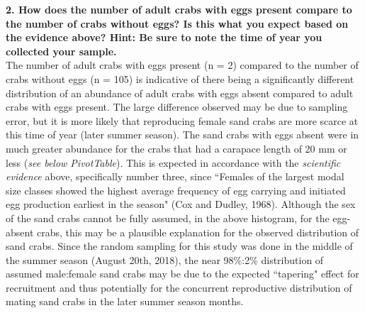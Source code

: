 \documentclass[11pt]{article}
\begin{document}
{\bf 2. How does the number of adult crabs with eggs present compare to the number of crabs without eggs? Is this what you expect based on the evidence above? Hint: Be sure to note the time of year you collected your sample.} \\
The number of adult crabs with eggs present (n = 2) compared to the number of crabs without eggs (n = 105) is indicative of there being a significantly different distribution of an abundance of adult crabs with eggs absent compared to adult crabs with eggs present. The large difference observed may be due to sampling error, but it is more likely that reproducing female sand crabs are more scarce at this time of year (later summer season). The sand crabs with eggs absent were in much greater abundance for the crabs that had a carapace length of 20 mm or less ({\it see below PivotTable}). This is expected in accordance with the {\it scientific evidence} above, specifically number three, since ``Females of the largest modal size classes showed the highest average frequency of egg carrying and initiated egg production earliest in the season" (Cox and Dudley, 1968). Although the sex of the sand crabs cannot be fully assumed, in the above histogram, for the egg-absent crabs, this may be a plausible explanation for the observed distribution of sand crabs. Since the random sampling for this study was done in the middle of the summer season (August 20th, 2018), the near 98\%:2\% distribution of assumed male:female sand crabs may be due to the expected ``tapering" effect for recruitment and thus potentially for the concurrent reproductive distribution of mating sand crabs in the later summer season months.
\end{document}
